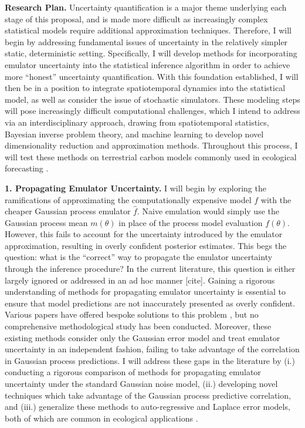 \documentclass[12pt]{article}
\begin{document}
\noindent
\textbf{Research Plan.} Uncertainty quantification is a major theme underlying each stage of this proposal, and is made more difficult
as increasingly complex statistical models require additional approximation techniques. Therefore, I will begin by addressing fundamental issues of uncertainty in the relatively simpler static, deterministic setting. Specifically, I will develop methods for incorporating emulator uncertainty into the statistical inference algorithm in order to achieve more ``honest'' uncertainty quantification. With this foundation established, I will then be in a position to integrate spatiotemporal dynamics into the statistical model, as well as consider the issue of stochastic simulators. These modeling steps will pose increasingly difficult computational challenges, which I intend to address via an interdisciplinary approach, drawing from spatiotemporal statistics, Bayesian inverse problem theory, and machine learning to develop novel dimensionality reduction and approximation methods. Throughout this process, I will test these methods on terrestrial carbon models commonly used in ecological forecasting \cite{Dietze, Canadell}. 
 
 \textbf{1. Propagating Emulator Uncertainty.} I will begin by exploring the ramifications of approximating the computationally expensive model $f$ with the  cheaper Gaussian process emulator $\hat{f}$. Naive emulation would simply use the Gaussian process mean $m(\theta)$ in place of the process model evaluation $f(\theta)$. However, this fails to account
 for the uncertainty introduced by the emulator approximation, resulting in overly confident posterior estimates. This begs the question: what is the ``correct'' way to propagate the emulator uncertainty through the inference procedure? In the current literature, this question is either largely ignored or addressed in an ad hoc manner [cite]. Gaining a rigorous understanding of methods for propagating emulator uncertainty is essential to ensure that model predictions are not inaccurately presented as overly confident. Various papers have offered bespoke solutions to this problem \cite{Cleary, Fer}, but no comprehensive
methodological study has been conducted. Moreover, these existing methods consider only the Gaussian error model and treat emulator uncertainty in an independent fashion, failing to take advantage of the correlation in Gaussian process predictions. I will address these gaps in the literature by (i.) conducting a rigorous comparison of methods for propagating emulator uncertainty under the standard Gaussian noise model, (ii.) developing novel techniques which take advantage of the Gaussian process predictive correlation, and (iii.) generalize these methods to auto-regressive and Laplace error models, both of which 
are common in ecological applications \cite{Fer}. 
\end{document}
